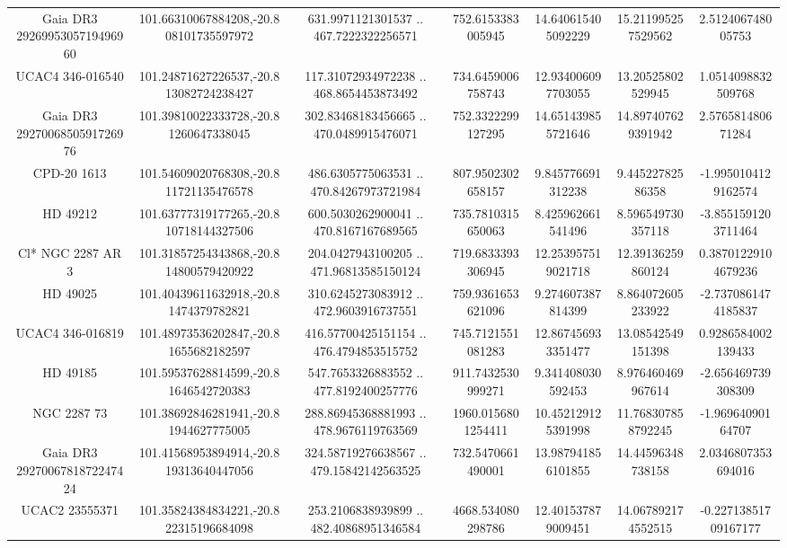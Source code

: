 \begin{table}
\begin{tabular}{ccccccc}
Gaia DR3 2926995305719496960 & 101.66310067884208,-20.808101735597972 & 631.9971121301537 .. 467.7222322256571 & 752.6153383005945 & 14.640615405092229 & 15.211995257529562 & 2.512406748005753 \\
UCAC4 346-016540 & 101.24871627226537,-20.813082724238427 & 117.31072934972238 .. 468.8654453873492 & 734.6459006758743 & 12.934006097703055 & 13.20525802529945 & 1.0514098832509768 \\
Gaia DR3 2927006850591726976 & 101.39810022333728,-20.81260647338045 & 302.83468183456665 .. 470.0489915476071 & 752.3322299127295 & 14.651439855721646 & 14.897407629391942 & 2.576581480671284 \\
CPD-20  1613 & 101.54609020768308,-20.811721135476578 & 486.6305775063531 .. 470.84267973721984 & 807.9502302658157 & 9.845776691312238 & 9.44522782586358 & -1.9950104129162574 \\
HD  49212 & 101.63777319177265,-20.810718144327506 & 600.5030262900041 .. 470.8167167689565 & 735.7810315650063 & 8.425962661541496 & 8.596549730357118 & -3.8551591203711464 \\
Cl* NGC 2287     AR       3 & 101.31857254343868,-20.814800579420922 & 204.0427943100205 .. 471.96813585150124 & 719.6833393306945 & 12.253957519021718 & 12.39136259860124 & 0.38701229104679236 \\
HD  49025 & 101.40439611632918,-20.81474379782821 & 310.6245273083912 .. 472.9603916737551 & 759.9361653621096 & 9.274607387814399 & 8.864072605233922 & -2.7370861474185837 \\
UCAC4 346-016819 & 101.48973536202847,-20.81655682182597 & 416.57700425151154 .. 476.4794853515752 & 745.7121551081283 & 12.867456933351477 & 13.08542549151398 & 0.9286584002139433 \\
HD  49185 & 101.59537628814599,-20.81646542720383 & 547.7653326883552 .. 477.8192400257776 & 911.7432530999271 & 9.341408030592453 & 8.976460469967614 & -2.656469739308309 \\
NGC  2287    73 & 101.38692846281941,-20.81944627775005 & 288.86945368881993 .. 478.9676119763569 & 1960.0156801254411 & 10.452129125391998 & 11.768307858792245 & -1.96964090164707 \\
Gaia DR3 2927006781872247424 & 101.41568953894914,-20.819313640447056 & 324.58719276638567 .. 479.15842142563525 & 732.5470661490001 & 13.987941856101855 & 14.44596348738158 & 2.0346807353694016 \\
UCAC2  23555371 & 101.35824384834221,-20.822315196684098 & 253.2106838939899 .. 482.40868951346584 & 4668.534080298786 & 12.401537879009451 & 14.067892174552515 & -0.22713851709167177 \\

\end{tabular}
\end{table}
